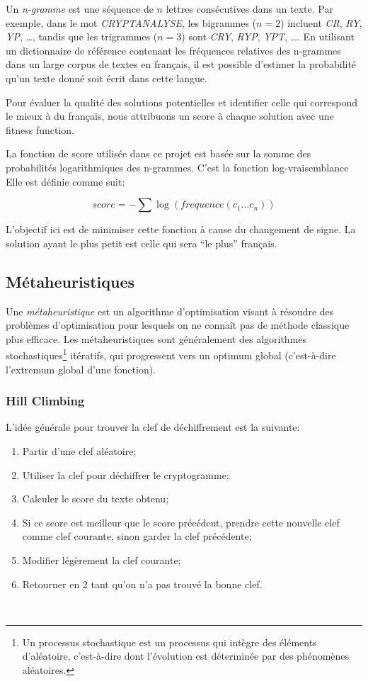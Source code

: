 \documentclass[a4paper]{article}
\begin{document}
Un \textit{n-gramme} est une séquence de $n$ lettres consécutives dans un texte. Par exemple, dans le mot \textit{CRYPTANALYSE}, les bigrammes ($n=2$) incluent \textit{CR}, \textit{RY}, \textit{YP}, \ldots, tandis que les trigrammes ($n=3$) sont \textit{CRY}, \textit{RYP}, \textit{YPT}, \ldots. 
En utilisant un dictionnaire de référence contenant les fréquences relatives des n-grammes dans un large corpus de textes en français, il est possible d'estimer la probabilité qu'un texte donné soit écrit dans cette langue.

Pour évaluer la qualité des solutions potentielles et identifier celle qui correspond le mieux à du français, nous  attribuons un score à chaque solution avec une fitness function.

La fonction de score utilisée dans ce projet est basée sur la somme des probabilités logarithmiques des n-grammes. C'est la fonction log-vraisemblance Elle est définie comme suit:

\[
score = - \sum \log(frequence(c_1 \ldots c_n))
\]

L’objectif ici est de minimiser cette fonction à cause du changement de signe. La solution ayant le plus petit est celle qui sera ``le plus'' français.

\subsection{Métaheuristiques}
Une \textit{métaheuristique} est un algorithme d’optimisation visant à résoudre des problèmes d’optimisation pour lesquels on ne connaît pas de méthode classique plus efficace.
Les métaheuristiques sont généralement des algorithmes stochastiques\footnote{Un processus stochastique est un processus qui intègre des éléments d'aléatoire, c'est-à-dire dont l'évolution est déterminée par des phénomènes aléatoires.} itératifs, qui progressent vers un optimum global (c'est-à-dire l'extremum global d'une fonction).
\subsubsection{Hill Climbing}

L'idée générale pour trouver la clef de déchiffrement est la suivante:
\begin{enumerate}
    \item Partir d'une clef aléatoire;
    \item Utiliser la clef pour déchiffrer le cryptogramme;
    \item Calculer le score du texte obtenu;
    \item Si ce score est meilleur que le score précédent, prendre cette nouvelle clef comme clef courante, sinon garder la clef précédente;
    \item Modifier légèrement la clef courante;
    \item Retourner en 2 tant qu'on n'a pas trouvé la bonne clef.
\end{enumerate}
\
\end{document}
